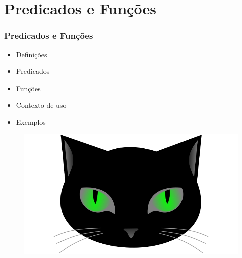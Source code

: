 \section{Predicados e Funções}

\begin{frame}
\frametitle{Predicados e Funções}
\begin{minipage}{0.47\textwidth}
    \begin{itemize}
        \item Definições
        \item Predicados
        \item Funções 
        \item Contexto de uso
        \item Exemplos        
    \end{itemize}
\end{minipage}
\begin{minipage}{0.5\textwidth}
\begin{figure}[ht!]
\begin{center}
\includegraphics[width=1.2\textwidth, height=0.40\textheight]{figures/logo_picat_alex.jpg}
\end{center}
\end{figure}
\end{minipage}
\end{frame}


